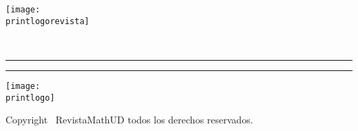 \newcommand{\CoverName}{Cover}%
\makeatletter  
\makeatother
\begin{titlepage}
	\renewcommand{\thepage}{\CoverName}
	\noindent
\end{titlepage}
\newpage\text{ }\thispagestyle{empty}\newpage 
\begin{coverpage}
		\vspace{2cm}
		\begin{tcolorbox}[transparent, width = \textwidth]
			\begin{center}
				\texttt{[image: \\printlogorevista]}
			\end{center}
		\end{tcolorbox}
		\begin{tcolorbox}[transparent, width = \textwidth]
			\begin{center}
				\printtitle\\
				\printauthor
			\end{center}
			\begin{center}
				{	
					\color{contraportada}\rule{\linewidth}{2pt}
					\hspace{2cm}\rule{\linewidth-2cm}{2pt}
				}
			\end{center}
		\end{tcolorbox}
		\begin{flushright}
			\Large\printedicion
		\end{flushright}
		\vspace{4cm}
		\begin{tcolorbox}
			\begin{center}
				\texttt{[image: \\printlogo]} 
			\end{center}
		\end{tcolorbox}
\end{coverpage}
\begin{copyrightpage}
	\Large Copyright \textcopyright\ RevistaMathUD todos los derechos reservados.
\end{copyrightpage}		
\newpage\text{ }\thispagestyle{empty}\newpage 
